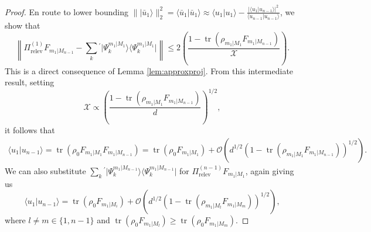 \begin{proof}
En route to lower bounding $\| \vert \bar{u}_1 \rangle \|_2^{2} = \langle \bar{u}_1\vert \bar{u}_1 \rangle \approx \langle u_1 \vert u_1 \rangle - \frac{\vert \langle u_1 \vert u_{n-1}\rangle \vert ^2}{\langle u_{n-1} \vert u_{n-1}\rangle}$, we show that 
\begin{equation}
\left\|\Pi_{\text{relev}}^{(1)}F_{m_1\vert M_{n-1}}-\sum_k{}^{'}\vert \Psi_k^{m_1\vert M_1} \rangle \langle \Psi_k^{m_1\vert M_1} \vert \right\| \leq 2\left( \frac{1-  \operatorname{tr}(\rho_{m_1\vert M_1}F_{m_1\vert M_{n-1}}) }{\mathcal{X}} \right).
\end{equation} This is a direct consequence of Lemma \ref{lem:approxproj}.
From this intermediate result, setting \begin{equation}
\mathcal{X}\propto\left(\frac{1-\operatorname{tr}(\rho_{m_1\vert M_1}F_{m_1\vert M_{n-1}})}{d}\right)^{1/2},\end{equation}
 it follows that 
\begin{equation}
\begin{split}
\langle u_1 \vert u_{n-1}\rangle =  \operatorname{tr}(\rho_0 F_{m_1 \vert M_1} F_{m_1 \vert M_{n-1}}) = \operatorname{tr}(\rho_0F_{m_1\vert M_1}) +\mathcal{O}\left(d^{1/2} \left(1-\operatorname{tr}(\rho_{m_1\vert M_1}F_{m_1\vert M_{n-1}})\right)^{1/2} \right).
\end{split}
\end{equation}
We can also substitute $\sum_k{}^{'}\vert \Psi_k ^{m_1\vert M_{n-1}}\rangle \langle \Psi_k ^{m_1\vert M_{n-1}} \vert$ for $\Pi_{\text{relev}}^{(n-1)}F_{m_1\vert M_1}$, again giving us\vspace{0.5em}
\begin{equation}
\langle u_1 \vert u_{n-1}\rangle = \operatorname{tr}(\rho_0 F_{m_1\vert M_i}) +  \mathcal{O}\left(d^{1/2} \left(1-\operatorname{tr}(\rho_{m_1\vert M_l}F_{m_1\vert M_m})\right)^{1/2} \right),\end{equation}
\vspace{0.5em}
where $l\neq m \in \{1,n-1\}$ and $\operatorname{tr}(\rho_0 F_{m_1\vert M_l})\geq \operatorname{tr}(\rho_0 F_{m_1\vert M_m})$.


\end{proof}
